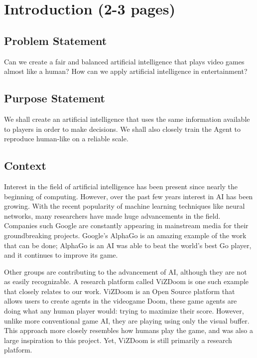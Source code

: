 \chapter{Introduction (2-3 pages)}


\section{Problem Statement} 

Can we create a fair and balanced artificial intelligence that plays video games almost like a human? How can we apply artificial intelligence in entertainment?





\section{Purpose Statement} 

We shall create an artificial intelligence that uses the same information available to players in order to make decisions. We shall also closely train the Agent to reproduce human-like on a reliable scale. 





\section{Context} 

Interest in the field of artificial intelligence has been present since nearly the beginning of computing. However, over the past few years interest in AI has been growing. With the recent popularity of machine learning techniques like neural networks, many researchers have made huge advancements in the field. Companies such Google are constantly appearing in mainstream media for their groundbreaking projects. Google's AlphaGo is an amazing example of the work that can be done; AlphaGo is an AI was able to beat the world's best Go player, and it continues to improve its game.

Other groups are contributing to the advancement of AI, although they are not as easily recognizable. A research platform called ViZDoom is one such example that closely relates to our work. ViZDoom is an Open Source platform that allows users to create agents in the videogame Doom, these game agents are doing what any human player would: trying to maximize their score. However, unlike more conventional game AI, they are playing using only the visual buffer. This approach more closely resembles how humans play the game, and was also a large inspiration to this project. Yet, ViZDoom is still primarily a research platform.


